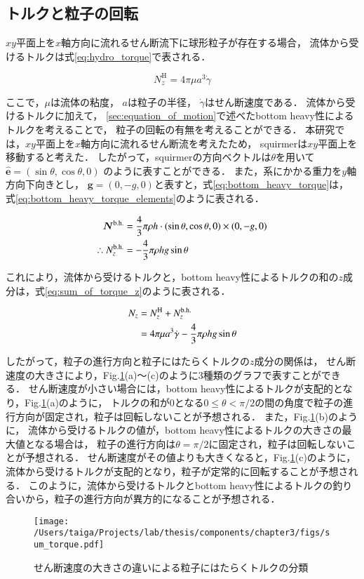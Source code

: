 \subsection{トルクと粒子の回転}
\label{sec:rotation}
$xy$平面上を$x$軸方向に流れるせん断流下に球形粒子が存在する場合，
流体から受けるトルクは式\eqref{eq:hydro_torque}で表される\cite{hidro_torque}．

    \begin{equation}
        N^\mathrm{H}_z = 4 \pi \mu a^3 \dot{\gamma}
        \label{eq:hydro_torque}
    \end{equation}

\noindent
ここで，$\mu$は流体の粘度，
$a$は粒子の半径，
$\dot{\gamma}$はせん断速度である．
流体から受けるトルクに加えて，
\ref{sec:equation_of_motion}で述べたbottom heavy性によるトルクを考えることで，
粒子の回転の有無を考えることができる．
本研究では，$xy$平面上を$x$軸方向に流れるせん断流を考えたため，
squirmerは$xy$平面上を移動すると考えた．
したがって，squirmerの方向ベクトルは$\theta$を用いて
$\boldsymbol{\hat{e}} = (\sin{\theta}, \cos{\theta}, 0)$
のように表すことができる．
また，系にかかる重力を$y$軸方向下向きとし，
$\boldsymbol{g} = (0, -g, 0)$と表すと，式\eqref{eq:bottom_heavy_torque}は，
式\eqref{eq:bottom_heavy_torque_elements}のように表される．

    \begin{align}
        \boldsymbol{N}^\mathrm{b.h.} &= \frac{4}{3} \pi \rho h \cdot (\sin{\theta}, \cos{\theta}, 0) \times (0, -g, 0) \notag \\
        \therefore N^\mathrm{b.h.}_z &= - \frac{4}{3} \pi \rho h g \sin{\theta}
        \label{eq:bottom_heavy_torque_elements}
    \end{align}

\noindent
これにより，流体から受けるトルクと，bottom heavy性によるトルクの和の$z$成分は，式\eqref{eq:sum_of_torque_z}のように表される．

    \begin{align}
        N_z &= N^\mathrm{H}_z + N^\mathrm{b.h.}_z \notag \\
            &= 4 \pi \mu a^3 \dot{\gamma} - \frac{4}{3} \pi \rho h g \sin{\theta}
        \label{eq:sum_of_torque_z}
    \end{align}

\noindent
したがって，粒子の進行方向と粒子にはたらくトルクの$z$成分の関係は，
せん断速度の大きさにより，Fig.\ref{fig:sum_torque}(a)〜(c)のように3種類のグラフで表すことができる．
せん断速度が小さい場合には，bottom heavy性によるトルクが支配的となり，Fig.\ref{fig:sum_torque}(a)のように，
トルクの和が0となる$0 \leq \theta < \pi / 2$の間の角度で粒子の進行方向が固定され，粒子は回転しないことが予想される．
また，Fig.\ref{fig:sum_torque}(b)のように，
流体から受けるトルクの値が，bottom heavy性によるトルクの大きさの最大値となる場合は，
粒子の進行方向は$\theta = \pi / 2$に固定され，粒子は回転しないことが予想される．
せん断速度がその値よりも大きくなると，Fig.\ref{fig:sum_torque}(c)のように，
流体から受けるトルクが支配的となり，粒子が定常的に回転することが予想される．
このように，流体から受けるトルクとbottom heavy性によるトルクの釣り合いから，粒子の進行方向が異方的になることが予想される．

\begin{figure}[H]
    \centering
    \texttt{[image: /Users/taiga/Projects/lab/thesis/components/chapter3/figs/sum\_torque.pdf]}
    \caption{せん断速度の大きさの違いによる粒子にはたらくトルクの分類}
    \label{fig:sum_torque}
\end{figure}
